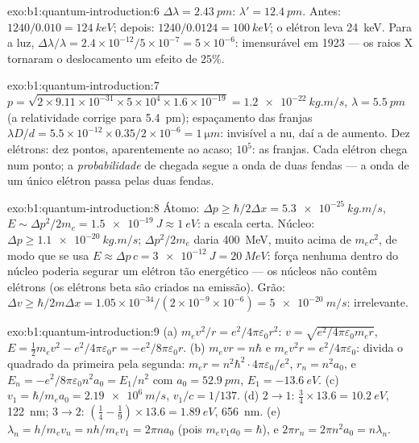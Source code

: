 \begin{solution}{exo:b1:quantum-introduction:6}
$\Delta\lambda = \qty{2.43}{pm}$: $\lambda' = \qty{12.4}{pm}$. Antes: $1240/0.010 =
\qty{124}{keV}$; depois: $1240/0.0124 = \qty{100}{keV}$; o elétron leva
\qty{24}{keV}. Para a luz, $\Delta\lambda/\lambda = 2.4 \times 10^{-12}/5 \times 10^{-7} = 5 \times
10^{-6}$: imensurável em 1923 --- os raios X tornaram o deslocamento um efeito de $25\%$.
\end{solution}

\begin{solution}{exo:b1:quantum-introduction:7}
$p = \sqrt{2 \times 9.11 \times 10^{-31} \times 5 \times 10^4 \times 1.6 \times 10^{-19}} =
\qty{1.2e-22}{kg.m/s}$, $\lambda = \qty{5.5}{pm}$ (a relatividade corrige para
\qty{5.4}{pm}); espaçamento das franjas $\lambda D/d = 5.5 \times 10^{-12} \times 0.35/2 \times 10^{-6}
= \qty{1}{\micro m}$: invisível a  nu, daí a  de aumento. Dez
elétrons: dez pontos, aparentemente ao acaso; $10^5$: as franjas. Cada
elétron chega num ponto; a \emph{probabilidade} de chegada segue
a onda de duas fendas --- a onda de um único elétron passa pelas duas fendas.
\end{solution}

\begin{solution}{exo:b1:quantum-introduction:8}
Átomo: $\Delta p \geq \hbar/2\Delta x = \qty{5.3e-25}{kg.m/s}$, $E \sim \Delta p^2/2m_e =
\qty{1.5e-19}{J} \approx \qty{1}{eV}$: a escala certa. Núcleo: $\Delta p \geq
\qty{1.1e-20}{kg.m/s}$; $\Delta p^2/2m_e$ daria \qty{400}{MeV}, muito acima de
$m_ec^2$, de modo que se usa $E \approx \Delta p\,c = \qty{3e-12}{J} = \qty{20}{MeV}$: força
nenhuma dentro do núcleo poderia segurar um elétron tão energético --- os núcleos não contêm
elétrons (os elétrons beta são criados na emissão). Grão: $\Delta v \geq
\hbar/2m\Delta x = 1.05 \times 10^{-34}/(2 \times 10^{-9} \times 10^{-6}) = \qty{5e-20}{m/s}$:
irrelevante.
\end{solution}

\begin{solution}{exo:b1:quantum-introduction:9}
(a) $m_ev^2/r = e^2/4\pi\varepsilon_0r^2$: $v = \sqrt{e^2/4\pi\varepsilon_0m_er}$, $E =
\tfrac12m_ev^2 - e^2/4\pi\varepsilon_0r = -e^2/8\pi\varepsilon_0r$. (b) $m_evr = n\hbar$ e
$m_ev^2r = e^2/4\pi\varepsilon_0$: divida o quadrado da primeira pela segunda:
$m_er = n^2\hbar^2 \cdot 4\pi\varepsilon_0/e^2$, $r_n = n^2a_0$, e $E_n = -e^2/8\pi\varepsilon_0n^2a_0
= E_1/n^2$ com $a_0 = \qty{52.9}{pm}$, $E_1 = \qty{-13.6}{eV}$. (c) $v_1 =
\hbar/m_ea_0 = \qty{2.19e6}{m/s}$, $v_1/c = 1/137$. (d) $2 \to 1$: $\tfrac34 \times
13.6 = \qty{10.2}{eV}$, \qty{122}{nm}; $3 \to 2$: $(\tfrac14 - \tfrac19) \times 13.6 =
\qty{1.89}{eV}$, \qty{656}{nm}. (e) $\lambda_n = h/m_ev_n = nh/m_ev_1 = 2\pi na_0$
(pois $m_ev_1a_0 = \hbar$), e $2\pi r_n = 2\pi n^2a_0 = n\lambda_n$.
\end{solution}

